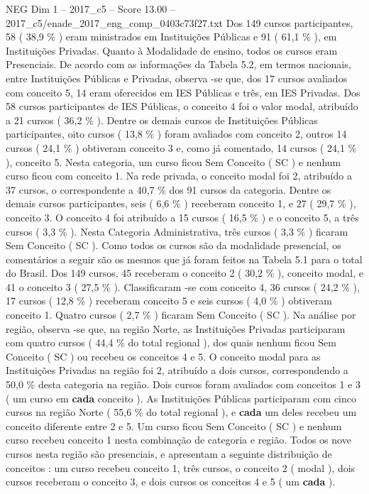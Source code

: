 \begin{textsample}{NEG Dim 1 – 2017\_c5 – Score 13.00 – 2017\_c5/enade\_2017\_eng\_comp\_0403c73f27.txt}
Dos 149 cursos participantes, 58 ( 38,9 \% ) eram ministrados em Instituições Públicas e 91 ( 61,1 \% ), em Instituições Privadas.
Quanto à Modalidade de ensino, todos os cursos eram Presenciais.
De acordo com as informações da Tabela 5.2, em termos nacionais, entre Instituições Públicas e Privadas, observa -se que, dos 17 cursos avaliados com conceito 5, 14 eram oferecidos em IES Públicas e três, em IES Privadas.
Dos 58 cursos participantes de IES Públicas, o conceito 4 foi o valor modal, atribuído a 21 cursos ( 36,2 \% ).
Dentre os demais cursos de Instituições Públicas participantes, oito cursos ( 13,8 \% ) foram avaliados com conceito 2, outros 14 cursos ( 24,1 \% ) obtiveram conceito 3 e, como já comentado, 14 cursos ( 24,1 \% ), conceito 5.
Nesta categoria, um curso ficou Sem Conceito ( SC ) e nenhum curso ficou com conceito 1.
Na rede privada, o conceito modal foi 2, atribuído a 37 cursos, o correspondente a 40,7 \% dos 91 cursos da categoria.
Dentre os demais cursos participantes, seis ( 6,6 \% ) receberam conceito 1, e 27 ( 29,7 \% ), conceito 3.
O conceito 4 foi atribuído a 15 cursos ( 16,5 \% ) e o conceito 5, a três cursos ( 3,3 \% ).
Nesta Categoria Administrativa, três cursos ( 3,3 \% ) ficaram Sem Conceito ( SC ).
Como todos os cursos são da modalidade presencial, os comentários a seguir são os mesmos que já foram feitos na Tabela 5.1 para o total do Brasil.
Dos 149 cursos, 45 receberam o conceito 2 ( 30,2 \% ), conceito modal, e 41 o conceito 3 ( 27,5 \% ).
Classificaram -se com conceito 4, 36 cursos ( 24,2 \% ), 17 cursos ( 12,8 \% ) receberam conceito 5 e seis cursos ( 4,0 \% ) obtiveram conceito 1.
Quatro cursos ( 2,7 \% ) ficaram Sem Conceito ( SC ).
Na análise por região, observa -se que, na região Norte, as Instituições Privadas participaram com quatro cursos ( 44,4 \% do total regional ), dos quais nenhum ficou Sem Conceito ( SC ) ou recebeu os conceitos 4 e 5.
O conceito modal para as Instituições Privadas na região foi 2, atribuído a dois cursos, correspondendo a 50,0 \% desta categoria na região.
Dois cursos foram avaliados com conceitos 1 e 3 ( um curso em \textbf{cada} conceito ).
As Instituições Públicas participaram com cinco cursos na região Norte ( 55,6 \% do total regional ), e \textbf{cada} um deles recebeu um conceito diferente entre 2 e 5.
Um curso ficou Sem Conceito ( SC ) e nenhum curso recebeu conceito 1 nesta combinação de categoria e região.
Todos os nove cursos nesta região são presenciais, e apresentam a seguinte distribuição de conceitos : um curso recebeu conceito 1, três cursos, o conceito 2 ( modal ), dois cursos receberam o conceito 3, e dois cursos os conceitos 4 e 5 ( um \textbf{cada} ).

\end{textsample}
